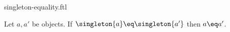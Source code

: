 \documentclass{stex}
\begin{document}
\begin{smodule}{singleton-equality.ftl}


\begin{proposition}[forthel,id=SingletonEqualityProp]
  Let $a, a'$ be objects.
  If $\singleton{a} \eq \singleton{a'}$ then $a \eq a'$.
\end{proposition}

\end{smodule}
\end{document}
